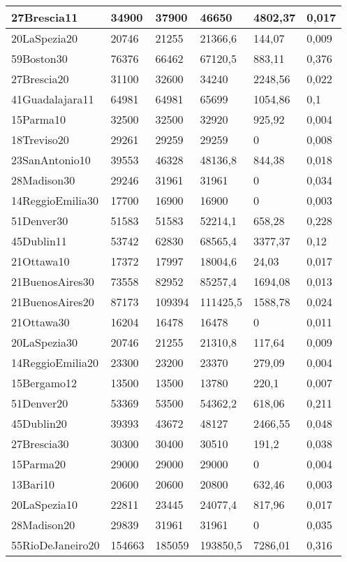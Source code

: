 \begin{longtable}[c]{|l|l|l|l|l|l|}
27Brescia11 & 34900 & 37900 & 46650 & 4802,37 & 0,017 \\ \hline
20LaSpezia20 & 20746 & 21255 & 21366,6 & 144,07 & 0,009 \\ \hline
59Boston30 & 76376 & 66462 & 67120,5 & 883,11 & 0,376 \\ \hline
27Brescia20 & 31100 & 32600 & 34240 & 2248,56 & 0,022 \\ \hline
41Guadalajara11 & 64981 & 64981 & 65699 & 1054,86 & 0,1 \\ \hline
15Parma10 & 32500 & 32500 & 32920 & 925,92 & 0,004 \\ \hline
18Treviso20 & 29261 & 29259 & 29259 & 0 & 0,008 \\ \hline
23SanAntonio10 & 39553 & 46328 & 48136,8 & 844,38 & 0,018 \\ \hline
28Madison30 & 29246 & 31961 & 31961 & 0 & 0,034 \\ \hline
14ReggioEmilia30 & 17700 & 16900 & 16900 & 0 & 0,003 \\ \hline
51Denver30 & 51583 & 51583 & 52214,1 & 658,28 & 0,228 \\ \hline
45Dublin11 & 53742 & 62830 & 68565,4 & 3377,37 & 0,12 \\ \hline
21Ottawa10 & 17372 & 17997 & 18004,6 & 24,03 & 0,017 \\ \hline
21BuenosAires30 & 73558 & 82952 & 85257,4 & 1694,08 & 0,013 \\ \hline
21BuenosAires20 & 87173 & 109394 & 111425,5 & 1588,78 & 0,024 \\ \hline
21Ottawa30 & 16204 & 16478 & 16478 & 0 & 0,011 \\ \hline
20LaSpezia30 & 20746 & 21255 & 21310,8 & 117,64 & 0,009 \\ \hline
14ReggioEmilia20 & 23300 & 23200 & 23370 & 279,09 & 0,004 \\ \hline
15Bergamo12 & 13500 & 13500 & 13780 & 220,1 & 0,007 \\ \hline
51Denver20 & 53369 & 53500 & 54362,2 & 618,06 & 0,211 \\ \hline
45Dublin20 & 39393 & 43672 & 48127 & 2466,55 & 0,048 \\ \hline
27Brescia30 & 30300 & 30400 & 30510 & 191,2 & 0,038 \\ \hline
15Parma20 & 29000 & 29000 & 29000 & 0 & 0,004 \\ \hline
13Bari10 & 20600 & 20600 & 20800 & 632,46 & 0,003 \\ \hline
20LaSpezia10 & 22811 & 23445 & 24077,4 & 817,96 & 0,017 \\ \hline
28Madison20 & 29839 & 31961 & 31961 & 0 & 0,035 \\ \hline
55RioDeJaneiro20 & 154663 & 185059 & 193850,5 & 7286,01 & 0,316 \\ \hline
\end{longtable}

